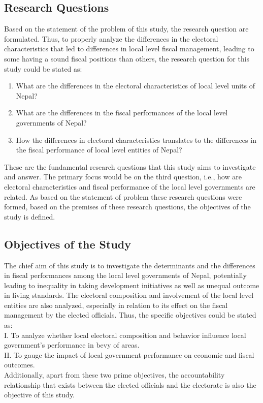 \subsection{Research Questions}
Based on the statement of the problem of this study, the research question are formulated. Thus, to properly analyze the differences in the electoral characteristics that led to differences in local level fiscal management, leading to some having a sound fiscal positions than others, the research question for this study could be stated as:
\begin{enumerate}[label=\roman*.]
    \item What are the differences in the electoral characteristics of  local level units of Nepal? 
    \item What are the differences in the fiscal performances of the local level governments of Nepal?
    \item How the differences in electoral characteristics translates to the differences in the fiscal performance of local level entities of Nepal?
 \end{enumerate}
 These are the fundamental research questions that this study aims to investigate and answer. The primary focus would be on the third question, i.e., how are electoral characteristics and fiscal performance of the local level governments are related. As based on the statement of problem these research questions were formed, based on the premises of these research questions, the objectives of the study is defined. \vspace{-4mm}
\subsection{Objectives of the Study}
The chief aim of this study is to investigate the determinants and the differences in fiscal performances among the local level governments of Nepal, potentially leading to inequality in taking development initiatives as well as unequal outcome in living standards. The electoral composition and involvement of the local level entities are also analyzed, especially in relation to its effect on the fiscal management by the elected officials. Thus, the specific objectives could be stated as:\\
I.\hspace{3mm} To analyze whether local electoral composition and behavior influence local government's performance in bevy of areas.  \\
II.\hspace{3mm} To gauge the impact of local government performance on economic and fiscal outcomes.\\
Additionally, apart from these two prime objectives, the accountability relationship that exists between the elected officials and  the electorate is also the objective of this study. \vspace{-3mm}
